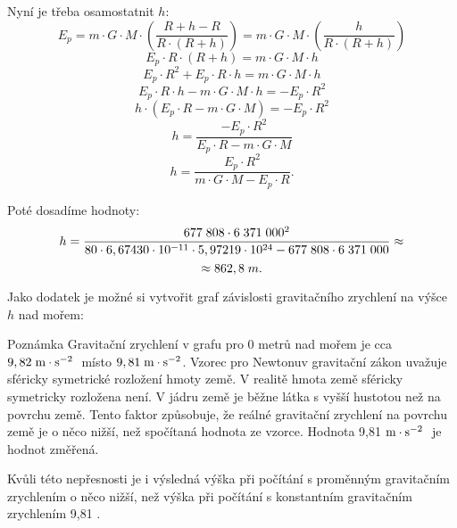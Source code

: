 \documentclass{article}
\begin{document}
Nyní je třeba osamostatnit $h$:
$$
    E_p = m \cdot G \cdot M \cdot \left( \frac{R + h - R}{R \cdot (R + h)} \right) = m \cdot G \cdot M \cdot \left( \frac{h}{R \cdot (R + h)} \right)
$$
$$
    E_p \cdot R \cdot (R + h) = m \cdot G \cdot M \cdot h
$$
$$
    E_p \cdot R^2 + E_p \cdot R \cdot h = m \cdot G \cdot M \cdot h
$$
$$
    E_p \cdot R \cdot h - m \cdot G \cdot M \cdot h = - E_p \cdot R^2
$$
$$
    h \cdot (E_p \cdot R - m \cdot G \cdot M) = - E_p \cdot R^2
$$
$$
    h = \frac{- E_p \cdot R^2}{E_p \cdot R - m \cdot G \cdot M}
$$
$$
    h = \frac{E_p \cdot R^2}{m \cdot G \cdot M - E_p \cdot R}.
$$

Poté dosadíme hodnoty:
$$
    h = \frac{677 \; 808 \cdot 6 \; 371 \; 000^2}{80 \cdot 6,67430 \cdot 10^{-11} \cdot 5,97219 \cdot 10^{24} - 677 \; 808 \cdot 6 \; 371 \; 000} \approx
$$
$$
    \approx 862,8 \; m.
$$

Jako dodatek je možné si vytvořit graf závislosti gravitačního zrychlení na výšce $h$ nad mořem:
\begin{center}
\end{center}

\begin{notebox}{Poznámka}
    Gravitační zrychlení v grafu pro 0 metrů nad mořem je cca $9,82 \; \textrm{m} \cdot \textrm{s}^{-2} \;$ místo $9,81 \; \textrm{m} \cdot \textrm{s}^{-2}$. Vzorec pro Newtonuv gravitační zákon uvažuje sféricky symetrické rozložení hmoty země. V realitě hmota země sféricky symetricky rozložena není. V jádru země je běžne látka s vyšší hustotou než na povrchu země. Tento faktor způsobuje, že reálné gravitační zrychlení na povrchu země je o něco nižší, než spočítaná hodnota ze vzorce. Hodnota 9,81 $\textrm{m} \cdot \textrm{s}^{-2} \;$ je hodnot změřená.

    Kvůli této nepřesnosti je i výsledná výška při počítání s proměnným gravitačním zrychlením o něco nižší, než výška při počítání s konstantním gravitačním zrychlením 9,81 \ueqMandSinvsq.
\end{notebox}
\end{document}
